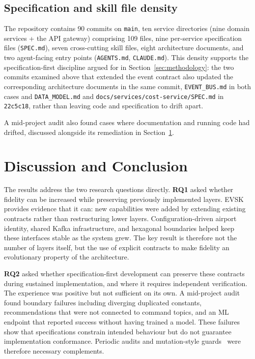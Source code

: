 \documentclass[runningheads]{llncs}
\begin{document}
\subsection{Specification and skill file density}

The repository contains 90 commits on \texttt{main}, ten service directories (nine domain services + the API gateway) comprising 109 files, nine per-service specification files (\texttt{SPEC.md}), seven cross-cutting skill files, eight architecture documents, and two agent-facing entry points (\texttt{AGENTS.md}, \texttt{CLAUDE.md}). This density supports the specification-first discipline argued for in Section~\ref{sec:methodology}: the two commits examined above that extended the event contract also updated the corresponding architecture documents in the same commit, \texttt{EVENT_BUS.md} in both cases and \texttt{DATA_MODEL.md} and \texttt{docs/services/cost-service/SPEC.md} in \texttt{22c5c18}, rather than leaving code and specification to drift apart.

A mid-project audit also found cases where documentation and running code had drifted, discussed alongside its remediation in Section~\ref{sec:discussion}.

\section{Discussion and Conclusion}\label{sec:discussion}

The results address the two research questions directly. \textbf{RQ1} asked whether fidelity can be increased while preserving previously implemented layers. EVSK provides evidence that it can: new capabilities were added by extending existing contracts rather than restructuring lower layers. Configuration-driven airport identity, shared Kafka infrastructure, and hexagonal boundaries helped keep these interfaces stable as the system grew. The key result is therefore not the number of layers itself, but the use of explicit contracts to make fidelity an evolutionary property of the architecture.

\textbf{RQ2} asked whether specification-first development can preserve these contracts during sustained implementation, and where it requires independent verification. The experience was positive but not sufficient on its own. A mid-project audit found boundary failures including diverging duplicated constants, recommendations that were not connected to command topics, and an ML endpoint that reported success without having trained a model. These failures show that specifications constrain intended behaviour but do not guarantee implementation conformance. Periodic audits and mutation-style guards~\cite{demillo1978} were therefore necessary complements.
\end{document}
